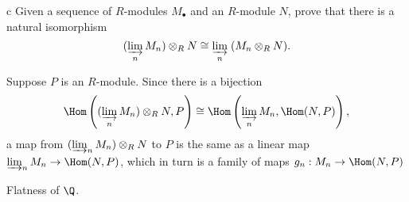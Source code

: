 \documentclass[11pt,letterpaper]{article}
\begin{document}
\begin{solution}
    \begin{partproblem}{c}
        Given a sequence of $R$-modules $M_\bullet$ and an $R$-module $N$, prove that there is a natural isomorphism
        \[
            (\varinjlim_n M_n)\otimes_R N \cong \varinjlim_n\; (M_n\otimes_R N)
        .\] 
    \end{partproblem}

    \quad Suppose $P$ is an $R$-module. Since there is a bijection 
    \[ \Hom\left((\varinjlim_n M_n)\otimes_R N, P\right)\cong \Hom\left(\varinjlim_n M_n, \Hom(N, P)\right),\]
    a map from $(\varinjlim_n M_n)\otimes_R N$ to $P$ is the same as a linear map $\varinjlim_n M_n\to \Hom(N, P)$, which in turn is a family of maps $g_n : M_n \to \Hom(N,P)$ 
\end{solution}

\begin{problem}
    Flatness of $\Q$.
\end{problem}
\end{document}
